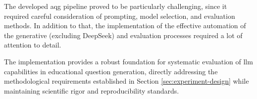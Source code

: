 The developed \ac{aqg} pipeline proved to be particularly challenging, since it required careful consideration of prompting, model selection, and evaluation methods. In addition to that, the implementation of the effective automation of the generative (excluding DeepSeek) and evaluation processes required a lot of attention to detail. 

The implementation provides a robust foundation for systematic evaluation of \ac{llm} capabilities in educational question generation, directly addressing the methodological requirements established in Section \ref{sec:experiment-design} while maintaining scientific rigor and reproducibility standards.